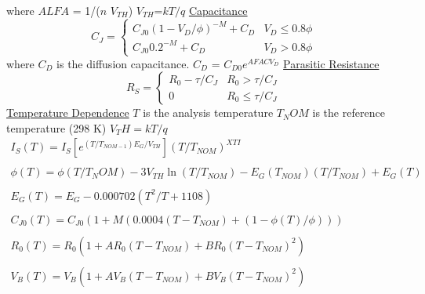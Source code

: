 where $ALFA$ = 1/($n$ $V_{TH}$)
\newline
$V_{TH}$=$kT/q$
\newline
\newline
\underline{Capacitance}
\newline
\begin{equation}
C_J= \left\{ \begin{array}{ll}
             C_{J0}(1-V_D/\phi)^{-M} + C_D & V_D \leq 0.8\phi \\
             C_{J0} 0.2^{-M} + C_D & V_D > 0.8\phi
             \end{array}
    \right.
\end{equation}
where $C_D$ is the diffusion capacitance.
\newline
$C_D$ = $C_{D0}e^{AFAC V_D}$
\newline
\underline{Parasitic Resistance}
\newline
\begin{equation}
R_S= \left\{ \begin{array}{ll}
             R_0 - \tau/C_J & R_0 > \tau/C_J \\
             0 & R_0 \leq \tau/C_J
             \end{array}
    \right.
\end{equation}
\underline{Temperature Dependence}
\newline
\newline
$T$ is the analysis temperature
\newline
$T_NOM$ is the reference temperature (298 K)
\newline
$V_TH=kT/q$
\newline
\begin{equation}
\begin{array}{l}
I_S(T)=I_S[e^{(T/T_{NOM-1})E_G/V_{TH}}](T/T_{NOM})^{XTI} \\
\\
\phi(T) = \phi(T/T_NOM) -3V_{TH}\ln(T/T_{NOM}) - E_G(T_{NOM})(T/T_{NOM}) + E_G(T) \\
\\
E_G(T)=E_G-0.000702(T^2/T+1108) \\
\\
C_{J0}(T)=C_{J0}(1+M(0.0004(T-T_{NOM})+(1-\phi(T)/\phi))) \\
\\
R_0(T)=R_0(1+AR_0(T-T_{NOM})+BR_0(T-T_{NOM})^2) \\
\\
V_B(T)=V_B(1+AV_B(T-T_{NOM})+BV_B(T-T_{NOM})^2)
\end{array}
\end{equation}
